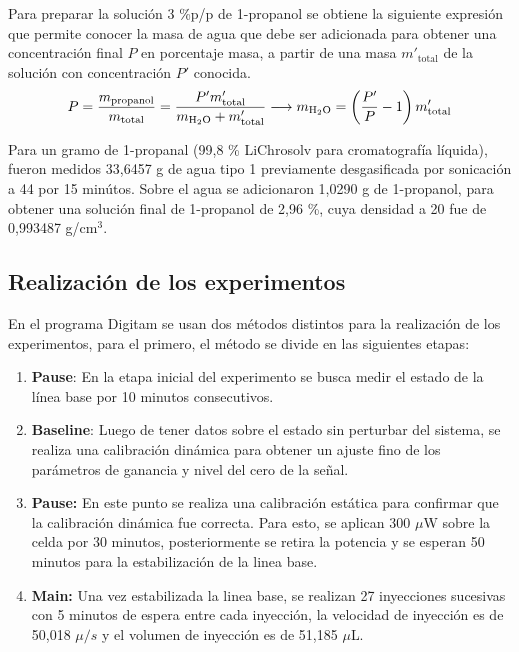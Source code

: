	Para preparar la soluci\'on 3 \%p/p de 1-propanol se obtiene la siguiente expresi\'on que permite conocer la masa de agua que debe ser adicionada para obtener una concentraci\'on final $P$ en porcentaje masa, a partir de una masa $m'_\text{total}$ de la soluci\'on con concentraci\'on $P'$ conocida.
	\begin{equation}\label{eq: massConcentration}
		P = \dfrac{m_\text{propanol}}{m_\text{total}} = \dfrac{P'm'_\text{total}}{m_\text{\ce{H2O}} + m'_\text{total}} \longrightarrow m_\text{\ce{H2O}} = \left(\dfrac{P'}{P} -1\right)m'_\text{total}
	\end{equation}
	
	Para un gramo de 1-propanal (99,8 \% LiChrosolv para cromatograf\'ia l\'iquida), fueron medidos 33,6457 g de agua tipo 1 previamente desgasificada por sonicaci\'on a 44 \grad{} por 15 min\'utos. Sobre el agua se adicionaron 1,0290 g de 1-propanol, para obtener una soluci\'on final de 1-propanol de 2,96 \%, cuya densidad a 20 \grad{} fue de 0,993487 g/cm$^3$.
	
	\subsection{Realizaci\'on de los experimentos}\label{sec: method}
	En el programa Digitam se usan dos m\'etodos distintos para la realizaci\'on de los experimentos, para el primero, el m\'etodo se divide en las siguientes etapas:
	\begin{enumerate}
		\item \textbf{Pause}: En la etapa inicial del experimento se busca medir el estado de la línea base por 10 minutos consecutivos.
		\item \textbf{Baseline}: Luego de tener datos sobre el estado sin perturbar del sistema, se realiza una calibración dinámica para obtener un ajuste fino de los parámetros de ganancia y nivel del cero de la señal. 
		\item \textbf{Pause:} En este punto se realiza una calibraci\'on est\'atica para confirmar que la calibraci\'on din\'amica fue correcta. Para esto, se aplican 300 $\mu$W sobre la celda por 30 minutos, posteriormente se retira la potencia y se esperan 50 minutos para la estabilizaci\'on de la linea base.
		\item \textbf{Main:} Una vez estabilizada la linea base, se realizan 27 inyecciones sucesivas con 5 minutos de espera entre cada inyecci\'on, la velocidad de inyecci\'on es de 50,018 $\mu/s$ y el volumen de inyecci\'on es de 51,185 $\mu$L.
	\end{enumerate}
	
